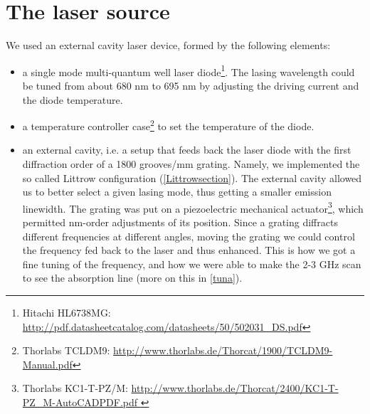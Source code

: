 \section{The laser source}\label{lasersource}
We used an external cavity laser device, formed by the following elements:
\begin{itemize}
\item a single mode multi-quantum well 
 laser diode\footnote{Hitachi HL6738MG: \url{http://pdf.datasheetcatalog.com/datasheets/50/502031_DS.pdf}}.
 The lasing wavelength could be tuned from about 680 nm to 695 nm by adjusting the driving current and the diode temperature.
\item a temperature controller case\footnote{Thorlabs TCLDM9: \url{http://www.thorlabs.de/Thorcat/1900/TCLDM9-Manual.pdf}} to set the temperature of the diode. 
\item an external cavity, i.e. a setup that feeds back the laser diode with the first diffraction order of a 1800 grooves/mm grating. Namely, we implemented the so called Littrow configuration (\cref{Littrowsection}). The external cavity allowed us to better select a given lasing mode, thus getting a smaller emission linewidth. The grating was put on a piezoelectric mechanical actuator\footnote{Thorlabs KC1-T-PZ/M: \url{http://www.thorlabs.de/Thorcat/2400/KC1-T-PZ_M-AutoCADPDF.pdf }}, which permitted nm-order adjustments of its position. Since a grating diffracts different frequencies at different angles, moving the grating we could control the frequency fed back to the laser and thus enhanced. This is how we got a fine tuning of the frequency, and how we were able to make the 2-3 GHz scan to see the absorption line (more on this in \cref{tuna}).
\end{itemize} 
